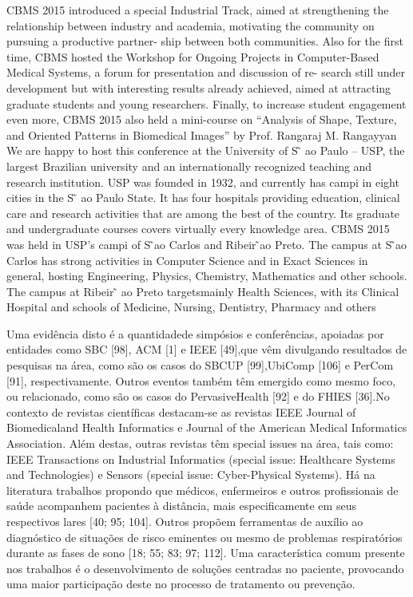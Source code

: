 CBMS 2015 introduced a special Industrial Track, aimed at strengthening the relationship
between industry and academia, motivating the community on pursuing a productive partner-
ship between both communities. Also for the first time, CBMS hosted the Workshop for Ongoing
Projects in Computer-Based Medical Systems, a forum for presentation and discussion of re-
search still under development but with interesting results already achieved, aimed at attracting
graduate students and young researchers. Finally, to increase student engagement even more,
CBMS 2015 also held a mini-course on “Analysis of Shape, Texture, and Oriented Patterns in
Biomedical Images” by Prof. Rangaraj M. Rangayyan~\cite{cbms2016}
We are happy to host this conference at the University of S ̃
ao Paulo – USP, the largest
Brazilian university and an internationally recognized teaching and research institution. USP
was founded in 1932, and currently has campi in eight cities in the S ̃
ao Paulo State. It has four
hospitals providing education, clinical care and research activities that are among the best of the
country. Its graduate and undergraduate courses covers virtually every knowledge area. CBMS
2015 was held in USP’s campi of S ̃ao Carlos and Ribeir ̃ao Preto. The campus at S ̃ao Carlos
has strong activities in Computer Science and in Exact Sciences in general, hosting Engineering,
Physics, Chemistry, Mathematics and other schools.  The campus at Ribeir ̃
ao Preto targetsmainly Health Sciences, with its Clinical Hospital and schools of Medicine, Nursing, Dentistry, Pharmacy and others~\cite{cbms2016}

Uma evidência disto é a quantidadede simpósios e conferências, apoiadas por entidades como SBC [98], ACM [1] e IEEE [49],que vêm divulgando resultados de pesquisas na área, como são os casos do SBCUP [99],UbiComp [106] e PerCom [91], respectivamente. Outros eventos também têm emergido como mesmo foco, ou relacionado, como são os casos do PervasiveHealth [92] e do FHIES [36].No contexto de revistas científicas destacam-se as revistas IEEE Journal of Biomedicaland Health Informatics e Journal of the American Medical Informatics Association. Além destas, outras revistas têm special issues na área, tais como: IEEE Transactions on Industrial
Informatics (special issue: Healthcare Systems and Technologies) e Sensors (special issue: Cyber-Physical Systems). Há na literatura trabalhos propondo que médicos, enfermeiros e outros profissionais de saúde acompanhem pacientes à distância, mais especificamente em seus respectivos lares [40; 95; 104]. Outros propõem ferramentas de auxílio ao diagnóstico de situações de risco eminentes ou mesmo de problemas respiratórios durante as fases de sono [18; 55; 83; 97; 112]. Uma característica comum presente nos trabalhos é o desenvolvimento de soluções centradas no paciente, provocando uma maior participação deste no processo de tratamento
ou prevenção. ~\cite{elhton}



